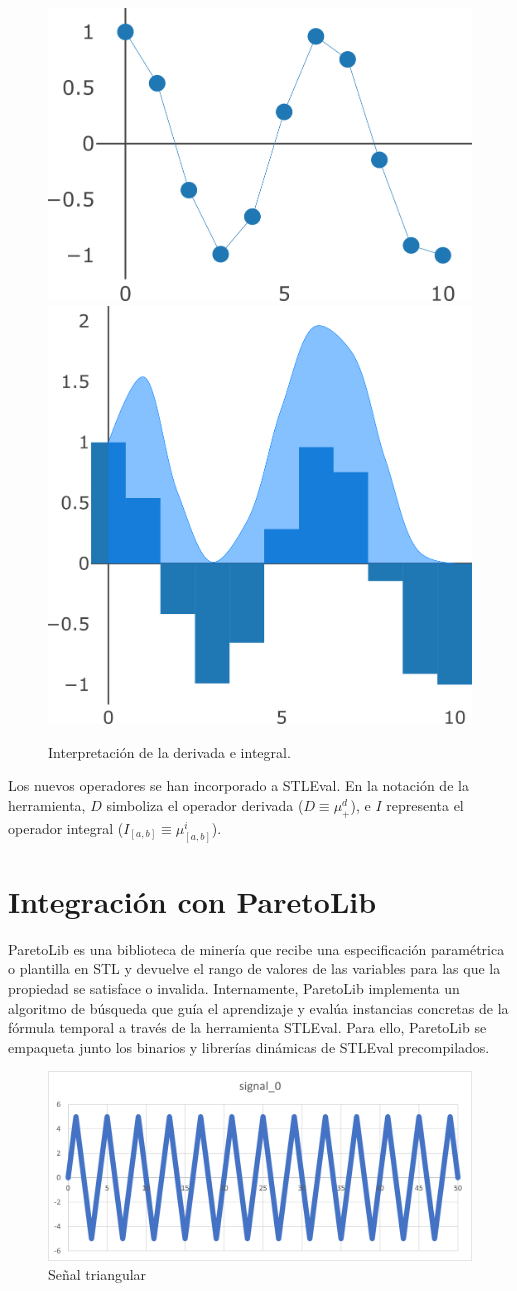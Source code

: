 \begin{figure}
\centering
  \includegraphics[width=.4\linewidth]{images/derivada} \hfill
  \includegraphics[width=.4\linewidth]{images/integral}
\caption{Interpretación de la derivada e integral.}
\label{fig:der_int}
\end{figure}

Los nuevos operadores se han incorporado a STLEval. En la notación de la herramienta, $D$ simboliza el operador derivada ($D \equiv \mu^d_{+}$), e $I$ representa el operador integral ($I_[a,b] \equiv \mu^i_{[a,b]}$).

\section{Integración con ParetoLib}
ParetoLib \cite{FORMATS_19, ParetoLib} es una biblioteca de minería que recibe una especificación paramétrica o plantilla en STL y devuelve el rango de valores de las variables para las que la propiedad se satisface o invalida. Internamente, ParetoLib implementa un algoritmo de búsqueda que guía el aprendizaje y evalúa instancias concretas de la fórmula temporal a través de la herramienta STLEval. Para ello, ParetoLib se empaqueta junto los binarios y librerías dinámicas de STLEval precompilados.


\begin{figure}[htb]
\centering
  \includegraphics[width=0.7\linewidth]{images/triangular} 
\caption{Señal triangular}
\label{fig:trian}
\end{figure}

